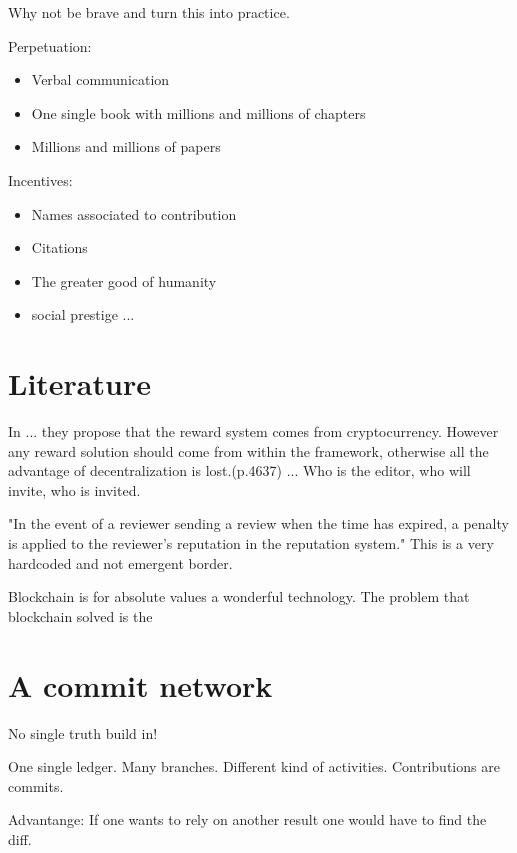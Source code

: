\documentclass[14pt]{article}
\begin{document}
Why not be brave and turn this into practice. 

Perpetuation:
\begin{itemize}
    \item Verbal communication
    \item One single book with millions and millions of chapters
    \item Millions and millions of papers
\end{itemize}

Incentives:
\begin{itemize}
    \item Names associated to contribution
    \item Citations 
    \item The greater good of humanity
    \item social prestige ...
\end{itemize}

\section{Literature}

In \cite{tenorio2019towards} ... they propose that the reward system comes from cryptocurrency. However any reward solution should come from within the framework, otherwise all the advantage of decentralization is lost.(p.4637) ... Who is the editor, who will invite, who is invited.

"In the event of a
reviewer sending a review when the time has expired,
a penalty is applied to the reviewer’s reputation in the
reputation system." This is a very hardcoded and not emergent border. 

Blockchain is for absolute values a wonderful technology. The problem that blockchain solved is the 

\section{A commit network}

No single truth build in!

One single ledger. Many branches. Different kind of activities. 
Contributions are commits. 

Advantange: If one wants to rely on another result one would have to find the diff.
\end{document}
